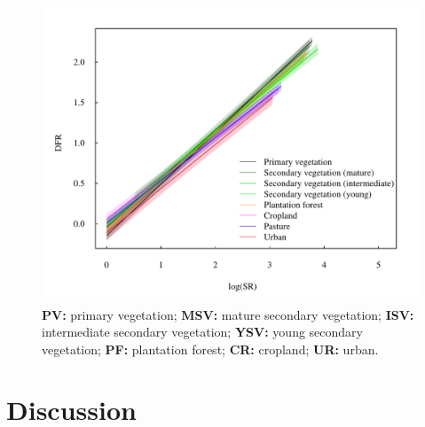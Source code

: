 \begin{figure}[h!]
\centering
\includegraphics[scale=0.70]{figures/chapter3/DFR/regression_lines}
\caption[]{\textbf{} \textbf{PV:} primary vegetation; \textbf{MSV:} mature secondary vegetation; \textbf{ISV:} intermediate secondary vegetation; \textbf{YSV:} young secondary vegetation; \textbf{PF:} plantation forest; \textbf{CR:} cropland; \textbf{UR:} urban.}
\label{LU_mean_FRic}
\end{figure}

\section{Discussion}




